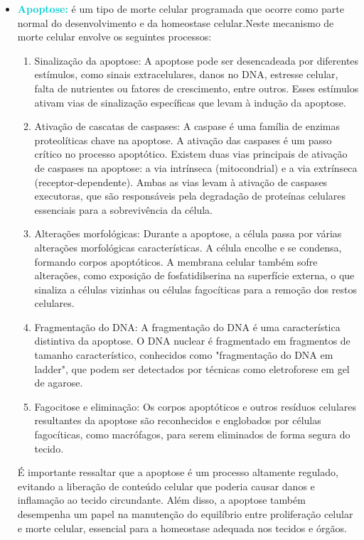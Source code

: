 \documentclass[11pt,a4paper]{article}
\begin{document}
		\begin{itemize}
			\item \textcolor{DarkTurquoise}{\textbf{Apoptose:}}  é um tipo de morte celular programada que ocorre como parte normal do desenvolvimento e da homeostase celular.Neste mecanismo de morte celular envolve os seguintes processos:
			\begin{enumerate}
				\item Sinalização da apoptose: A apoptose pode ser desencadeada por diferentes estímulos, como sinais extracelulares, danos no DNA, estresse celular, falta de nutrientes ou fatores de crescimento, entre outros. Esses estímulos ativam vias de sinalização específicas que levam à indução da apoptose.
				\item Ativação de cascatas de caspases: A caspase é uma família de enzimas proteolíticas chave na apoptose. A ativação das caspases é um passo crítico no processo apoptótico. Existem duas vias principais de ativação de caspases na apoptose: a via intrínseca (mitocondrial) e a via extrínseca (receptor-dependente). Ambas as vias levam à ativação de caspases executoras, que são responsáveis pela degradação de proteínas celulares essenciais para a sobrevivência da célula.
				\item Alterações morfológicas: Durante a apoptose, a célula passa por várias alterações morfológicas características. A célula encolhe e se condensa, formando corpos apoptóticos. A membrana celular também sofre alterações, como exposição de fosfatidilserina na superfície externa, o que sinaliza a células vizinhas ou células fagocíticas para a remoção dos restos celulares.
				\item Fragmentação do DNA: A fragmentação do DNA é uma característica distintiva da apoptose. O DNA nuclear é fragmentado em fragmentos de tamanho característico, conhecidos como "fragmentação do DNA em ladder", que podem ser detectados por técnicas como eletroforese em gel de agarose.
				\item Fagocitose e eliminação: Os corpos apoptóticos e outros resíduos celulares resultantes da apoptose são reconhecidos e englobados por células fagocíticas, como macrófagos, para serem eliminados de forma segura do tecido.
			\end{enumerate}

				É importante ressaltar que a apoptose é um processo altamente regulado, evitando a liberação de conteúdo celular que poderia causar danos e inflamação ao tecido circundante. Além disso, a apoptose também desempenha um papel na manutenção do equilíbrio entre proliferação celular e morte celular, essencial para a homeostase adequada nos tecidos e órgãos.


\end{itemize}
\end{document}
